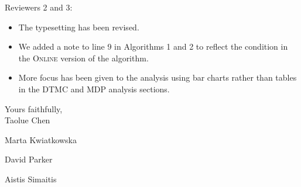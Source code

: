 \documentclass[a4paper,10pt]{article}
\begin{document}
\noindent Reviewers 2 and 3:
\begin{itemize}

\item The typesetting has been revised.
\item We added a note to line 9 in Algorithms 1 and 2 to reflect the condition in the \textsc{Online} version of the algorithm.
\item More focus has been given to the analysis using bar charts rather than tables in the DTMC and MDP analysis sections.


\end{itemize}

\bigskip
\bigskip

\noindent Yours faithfully,\\


\noindent Taolue Chen

\noindent Marta Kwiatkowska

\noindent David Parker

\noindent Aistis Simaitis
\end{document}
